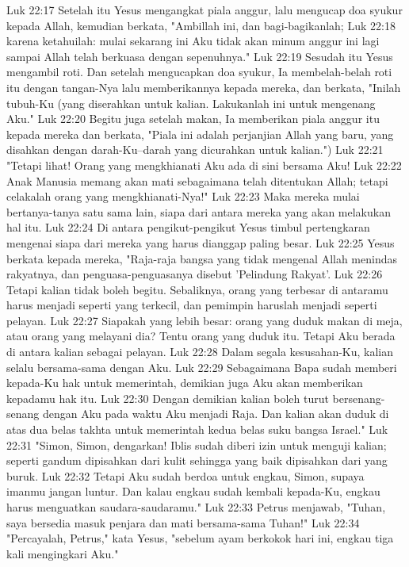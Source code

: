 Luk 22:17  Setelah itu Yesus mengangkat piala anggur, lalu mengucap doa syukur kepada Allah, kemudian berkata, "Ambillah ini, dan bagi-bagikanlah;
Luk 22:18  karena ketahuilah: mulai sekarang ini Aku tidak akan minum anggur ini lagi sampai Allah telah berkuasa dengan sepenuhnya."
Luk 22:19  Sesudah itu Yesus mengambil roti. Dan setelah mengucapkan doa syukur, Ia membelah-belah roti itu dengan tangan-Nya lalu memberikannya kepada mereka, dan berkata, "Inilah tubuh-Ku (yang diserahkan untuk kalian. Lakukanlah ini untuk mengenang Aku."
Luk 22:20  Begitu juga setelah makan, Ia memberikan piala anggur itu kepada mereka dan berkata, "Piala ini adalah perjanjian Allah yang baru, yang disahkan dengan darah-Ku--darah yang dicurahkan untuk kalian.")
Luk 22:21  "Tetapi lihat! Orang yang mengkhianati Aku ada di sini bersama Aku!
Luk 22:22  Anak Manusia memang akan mati sebagaimana telah ditentukan Allah; tetapi celakalah orang yang mengkhianati-Nya!"
Luk 22:23  Maka mereka mulai bertanya-tanya satu sama lain, siapa dari antara mereka yang akan melakukan hal itu.
Luk 22:24  Di antara pengikut-pengikut Yesus timbul pertengkaran mengenai siapa dari mereka yang harus dianggap paling besar.
Luk 22:25  Yesus berkata kepada mereka, "Raja-raja bangsa yang tidak mengenal Allah menindas rakyatnya, dan penguasa-penguasanya disebut 'Pelindung Rakyat'.
Luk 22:26  Tetapi kalian tidak boleh begitu. Sebaliknya, orang yang terbesar di antaramu harus menjadi seperti yang terkecil, dan pemimpin haruslah menjadi seperti pelayan.
Luk 22:27  Siapakah yang lebih besar: orang yang duduk makan di meja, atau orang yang melayani dia? Tentu orang yang duduk itu. Tetapi Aku berada di antara kalian sebagai pelayan.
Luk 22:28  Dalam segala kesusahan-Ku, kalian selalu bersama-sama dengan Aku.
Luk 22:29  Sebagaimana Bapa sudah memberi kepada-Ku hak untuk memerintah, demikian juga Aku akan memberikan kepadamu hak itu.
Luk 22:30  Dengan demikian kalian boleh turut bersenang-senang dengan Aku pada waktu Aku menjadi Raja. Dan kalian akan duduk di atas dua belas takhta untuk memerintah kedua belas suku bangsa Israel."
Luk 22:31  "Simon, Simon, dengarkan! Iblis sudah diberi izin untuk menguji kalian; seperti gandum dipisahkan dari kulit sehingga yang baik dipisahkan dari yang buruk.
Luk 22:32  Tetapi Aku sudah berdoa untuk engkau, Simon, supaya imanmu jangan luntur. Dan kalau engkau sudah kembali kepada-Ku, engkau harus menguatkan saudara-saudaramu."
Luk 22:33  Petrus menjawab, "Tuhan, saya bersedia masuk penjara dan mati bersama-sama Tuhan!"
Luk 22:34  "Percayalah, Petrus," kata Yesus, "sebelum ayam berkokok hari ini, engkau tiga kali mengingkari Aku."
